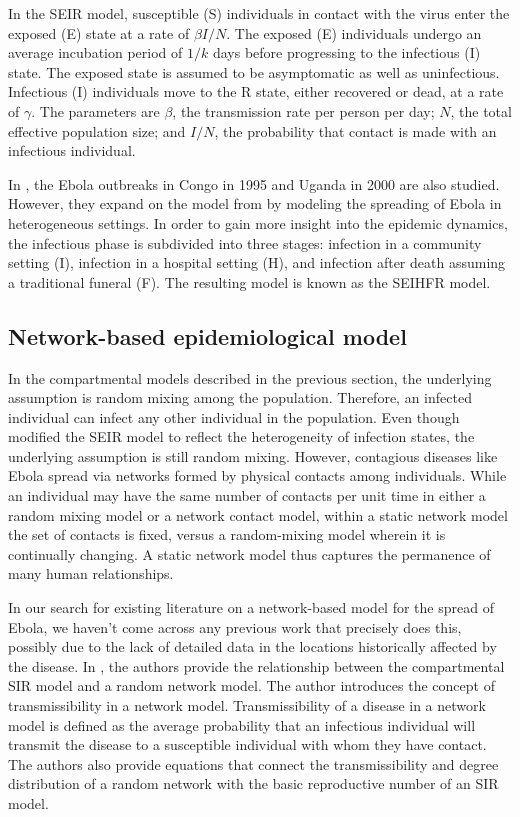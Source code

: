 \documentclass[10pt, journal,onecolumn]{IEEEtran}
\begin{document}
In the SEIR model, susceptible (S) individuals in contact with the virus enter the exposed (E) state
at a rate of $\beta I / N$.
The exposed (E) individuals undergo an average incubation period of $1/k$ days before progressing to
the infectious (I) state. The exposed state is assumed to be asymptomatic as well as uninfectious.
Infectious (I) individuals move to the R state, either recovered or dead, at a rate of $\gamma$.
 The parameters are $\beta$, the transmission rate per person per day;
$N$, the total effective population size; and $I/N$, the probability that contact is made with
an infectious individual.

In \citep{legrand2007understanding}, the Ebola outbreaks in Congo in 1995 and Uganda in 2000 are
also studied. However, they expand on the model from \citep{chowell2004basic} by modeling the
spreading of Ebola in heterogeneous settings. In order to gain more insight into the epidemic
dynamics, the infectious phase is subdivided into three stages: infection in a community setting
(I), infection in a hospital setting (H), and infection after death assuming a traditional funeral
(F). The resulting model is known as the SEIHFR model.

\subsection{{Network-based epidemiological model}}

In the compartmental models described in the previous section, the underlying assumption is random
mixing among the population. Therefore, an infected individual can infect any other individual in the
population. Even though \citep{legrand2007understanding} modified the SEIR model to reflect the
heterogeneity of infection states, the underlying assumption is still random mixing. However,
contagious diseases like Ebola spread via networks formed by physical contacts among individuals.
While an individual may have the same number of contacts per unit time in either a random mixing
model or a network contact model, within a static network model the set of contacts is fixed, versus
a random-mixing model wherein it is continually changing. A static network model thus captures the
permanence of many human relationships.

In our search for existing literature on a network-based model for the spread of Ebola, we haven't come
across any previous work that precisely does this, possibly due to the lack of detailed data in the
locations historically affected by the disease.  In \citep{newman2002spread}, the authors provide
the relationship between the compartmental SIR model and a random network model. The author introduces
the concept of transmissibility in a network model. Transmissibility of a disease in a network model
is defined as the average probability that an infectious individual will transmit the disease to a
susceptible individual with whom they have contact. The authors also provide equations that connect
the transmissibility and degree distribution of a random network with the basic reproductive number
of an SIR model.
\end{document}

